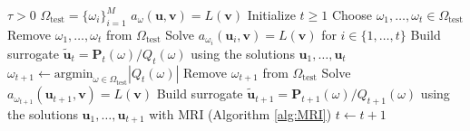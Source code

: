 \begin{algorithmic}
    \Require $\tau > 0$ 
    \Require $\Omega_{\mathrm{test}} = \{\omega_i\}_{i=1}^M$ 
    \Require $a_{\omega}(\mathbf{u}, \mathbf{v}) = L(\mathbf{v})$ 
    \State Initialize $t \geq 1$
    \State Choose $\omega_1, \dots, \omega_t \in \Omega_{\mathrm{test}}$ 
    \State Remove $\omega_1, \dots, \omega_t$ from $\Omega_{\mathrm{test}}$
    \State Solve $a_{\omega_i}(\mathbf{u}_i, \mathbf{v}) = L(\mathbf{v})$ for $i \in \{1, \dots, t\}$
    \State Build surrogate $\mathbf{\tilde{u}}_t = \mathbf{P}_t(\omega) / Q_t(\omega)$ using the solutions $\mathbf{u}_1, \dots, \mathbf{u}_t$
        \State $\omega_{t+1} \leftarrow \textrm{argmin}_{\omega \in \Omega_{\mathrm{test}}} |Q_t(\omega)|$
        \State Remove $\omega_{t+1}$ from $\Omega_{\mathrm{test}}$
        \State Solve $a_{\omega_{t+1}}(\mathbf{u}_{t+1}, \mathbf{v}) = L(\mathbf{v})$
        \State Build surrogate $\mathbf{\tilde{u}}_{t+1} = \mathbf{P}_{t+1}(\omega) / Q_{t+1}(\omega)$ using the solutions $\mathbf{u}_1, \dots, \mathbf{u}_{t+1}$ with \acrshort{MRI} (Algorithm \ref{alg:MRI})
            \Return
        \EndIf
        \State $t \leftarrow t+1$
    \EndWhile
\end{algorithmic}